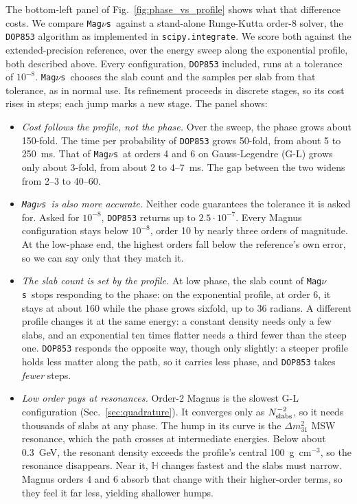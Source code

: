 \documentclass[final,5p,times,twocolumn,sort,compress]{elsarticle}
\makeatletter
\newcommand{\fig}{Fig.}
\DeclareRobustCommand{\_}{%
  \ifmmode\nfss@text{\textunderscore}\else\textunderscore\allowbreak\fi}
\newcommand{\figu}[1]{\fig~\ref{fig:#1}}
\newcommand{\magnus}{{\tt Mag}\ensuremath{\nu}{\tt s}}
\makeatother
\begin{document}
The bottom-left panel of \figu{phase_vs_profile} shows what that difference costs. We compare \magnus\ against a stand-alone Runge-Kutta order-8 solver, the \texttt{DOP853} algorithm as implemented in \texttt{scipy.integrate}. We score both against the extended-precision reference, over the energy sweep along the exponential profile, both described above. Every configuration, {\tt DOP853} included, runs at a tolerance of $10^{-8}$. \magnus\ chooses the slab count and the samples per slab from that tolerance, as in normal use. Its refinement proceeds in discrete stages, so its cost rises in steps; each jump marks a new stage. The panel shows:
\begin{itemize}
\item \textit{Cost follows the profile, not the phase.} Over the sweep, the phase grows about 150-fold. The time per probability of {\tt DOP853} grows 50-fold, from about 5 to 250~ms. That of \magnus\ at orders 4 and 6 on Gauss-Legendre (G-L) grows only about 3-fold, from about 2 to 4--7~ms. The gap between the two widens from 2--3 to 40--60.
\item \textit{\magnus\ is also more accurate.} Neither code guarantees the tolerance it is asked for. Asked for $10^{-8}$, {\tt DOP853} returns up to $2.5 \cdot 10^{-7}$. Every Magnus configuration stays below $10^{-8}$, order 10 by nearly three orders of magnitude. At the low-phase end, the highest orders fall below the reference's own error, so we can say only that they match it.
\item \textit{The slab count is set by the profile.} At low phase, the slab count of \magnus\ stops responding to the phase: on the exponential profile, at order 6, it stays at about 160 while the phase grows sixfold, up to 36 radians. A different profile changes it at the same energy: a constant density needs only a few slabs, and an exponential ten times flatter needs a third fewer than the steep one. {\tt DOP853} responds the opposite way, though only slightly: a steeper profile holds less matter along the path, so it carries less phase, and {\tt DOP853} takes \emph{fewer} steps.
\item \textit{Low order pays at resonances.} Order-2 Magnus is the slowest G-L configuration (Sec.~\ref{sec:quadrature}). It converges only as $N_{\rm slabs}^{-2}$, so it needs thousands of slabs at any phase. The hump in its curve is the $\Delta m^2_{31}$ MSW resonance, which the path crosses at intermediate energies. Below about 0.3~GeV, the resonant density exceeds the profile's central 100~g~cm$^{-3}$, so the resonance disappears. Near it, $\mathbb{H}$ changes fastest and the slabs must narrow. Magnus orders 4 and 6 absorb that change with their higher-order terms, so they feel it far less, yielding shallower humps.

\end{itemize}
\end{document}
